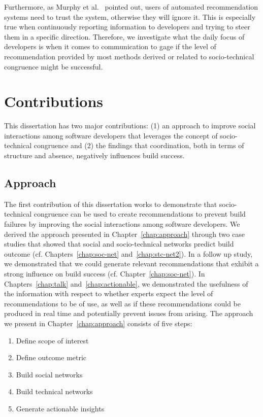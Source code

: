 Furthermore, as Murphy et al.~\cite{murphy:rsse:2010} pointed out, users of automated recommendation systems need to trust the system, otherwise they will ignore it.
This is especially true when continuously reporting information to developers and trying to steer them in a specific direction.
Therefore, we investigate what the daily focus of developers is when it comes to communication to gage if the level of recommendation provided by most methods derived or related to socio-technical congruence might be successful.




\section{Contributions}
This dissertation has two major contributions: (1) an approach to improve social interactions among software developers that leverages the concept of socio-technical congruence and (2)
the findings that coordination, both in terms of structure and absence, negatively influences build success.

\subsection{Approach}
The first contribution of this dissertation works to demonstrate that socio-technical congruence can be used to create recommendations to prevent build failures by improving the social interactions among software developers.
We derived the approach presented in Chapter~\ref{chap:approach} through two case studies that showed that social and socio-technical networks predict build outcome (cf. Chapters~\ref{chap:soc-net} and~\ref{chap:stc-net2}).
In a follow up study, we demonstrated that we could generate relevant recommendations that exhibit a strong influence on build success (cf. Chapter~\ref{chap:soc-net}).
In Chapters~\ref{chap:talk} and~\ref{chap:actionable}, we demonstrated the usefulness of the information with respect to whether experts expect the level of recommendations to be of use, as well as if these recommendations could be produced in real time and potentially prevent issues from arising.
The approach we present in Chapter~\ref{chap:approach} consists of five steps:

\begin{enumerate}
\item Define scope of interest
\item Define outcome metric
\item Build social networks
\item Build technical networks
\item Generate actionable insights
\end{enumerate}

